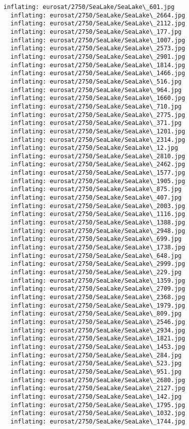 \documentclass[11pt]{article}
\begin{document}
\begin{Verbatim}[commandchars=\\\{\}]
  inflating: eurosat/2750/SeaLake/SeaLake\_601.jpg
  inflating: eurosat/2750/SeaLake/SeaLake\_2664.jpg
  inflating: eurosat/2750/SeaLake/SeaLake\_2112.jpg
  inflating: eurosat/2750/SeaLake/SeaLake\_177.jpg
  inflating: eurosat/2750/SeaLake/SeaLake\_1007.jpg
  inflating: eurosat/2750/SeaLake/SeaLake\_2573.jpg
  inflating: eurosat/2750/SeaLake/SeaLake\_2901.jpg
  inflating: eurosat/2750/SeaLake/SeaLake\_1814.jpg
  inflating: eurosat/2750/SeaLake/SeaLake\_1466.jpg
  inflating: eurosat/2750/SeaLake/SeaLake\_516.jpg
  inflating: eurosat/2750/SeaLake/SeaLake\_964.jpg
  inflating: eurosat/2750/SeaLake/SeaLake\_1660.jpg
  inflating: eurosat/2750/SeaLake/SeaLake\_710.jpg
  inflating: eurosat/2750/SeaLake/SeaLake\_2775.jpg
  inflating: eurosat/2750/SeaLake/SeaLake\_371.jpg
  inflating: eurosat/2750/SeaLake/SeaLake\_1201.jpg
  inflating: eurosat/2750/SeaLake/SeaLake\_2314.jpg
  inflating: eurosat/2750/SeaLake/SeaLake\_12.jpg
  inflating: eurosat/2750/SeaLake/SeaLake\_2810.jpg
  inflating: eurosat/2750/SeaLake/SeaLake\_2462.jpg
  inflating: eurosat/2750/SeaLake/SeaLake\_1577.jpg
  inflating: eurosat/2750/SeaLake/SeaLake\_1905.jpg
  inflating: eurosat/2750/SeaLake/SeaLake\_875.jpg
  inflating: eurosat/2750/SeaLake/SeaLake\_407.jpg
  inflating: eurosat/2750/SeaLake/SeaLake\_2003.jpg
  inflating: eurosat/2750/SeaLake/SeaLake\_1116.jpg
  inflating: eurosat/2750/SeaLake/SeaLake\_1388.jpg
  inflating: eurosat/2750/SeaLake/SeaLake\_2948.jpg
  inflating: eurosat/2750/SeaLake/SeaLake\_699.jpg
  inflating: eurosat/2750/SeaLake/SeaLake\_1738.jpg
  inflating: eurosat/2750/SeaLake/SeaLake\_648.jpg
  inflating: eurosat/2750/SeaLake/SeaLake\_2999.jpg
  inflating: eurosat/2750/SeaLake/SeaLake\_229.jpg
  inflating: eurosat/2750/SeaLake/SeaLake\_1359.jpg
  inflating: eurosat/2750/SeaLake/SeaLake\_2709.jpg
  inflating: eurosat/2750/SeaLake/SeaLake\_2368.jpg
  inflating: eurosat/2750/SeaLake/SeaLake\_1979.jpg
  inflating: eurosat/2750/SeaLake/SeaLake\_809.jpg
  inflating: eurosat/2750/SeaLake/SeaLake\_2546.jpg
  inflating: eurosat/2750/SeaLake/SeaLake\_2934.jpg
  inflating: eurosat/2750/SeaLake/SeaLake\_1821.jpg
  inflating: eurosat/2750/SeaLake/SeaLake\_1453.jpg
  inflating: eurosat/2750/SeaLake/SeaLake\_284.jpg
  inflating: eurosat/2750/SeaLake/SeaLake\_523.jpg
  inflating: eurosat/2750/SeaLake/SeaLake\_951.jpg
  inflating: eurosat/2750/SeaLake/SeaLake\_2680.jpg
  inflating: eurosat/2750/SeaLake/SeaLake\_2127.jpg
  inflating: eurosat/2750/SeaLake/SeaLake\_142.jpg
  inflating: eurosat/2750/SeaLake/SeaLake\_1795.jpg
  inflating: eurosat/2750/SeaLake/SeaLake\_1032.jpg
  inflating: eurosat/2750/SeaLake/SeaLake\_1744.jpg

\end{Verbatim}
\end{document}
